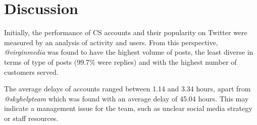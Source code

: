 \documentclass[sigconf]{acmart}
\begin{document}
{%





\section{Discussion}\label{discussion}

Initially, the performance of CS accounts and their popularity on
Twitter were measured by an analysis of activity and users. From this
perspective, {\emph{@virginmedia}} was found to have the highest
volume of posts, the least diverse in terms of type of posts (99.7\%
were replies) and with the highest number of customers served.

The average delays of accounts ranged between 1.14 and
3.34 hours, apart from {\emph{@skyhelpteam}} which was found with an average
delay of 45.04 hours. This may indicate a management issue for the
team, such as unclear social media strategy or staff resources. 

}
\end{document}
